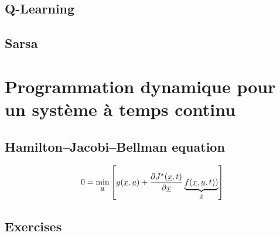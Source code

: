 \subsection{Q-Learning}

\subsection{Sarsa}


\section{Programmation dynamique pour un système à temps continu}
\label{sec:dp_continu}

\subsection{Hamilton–Jacobi–Bellman equation}

\begin{align}
0 =
\operatornamewithlimits{min}\limits_{\col{u}}
\left[
g(\col{x} , \col{u} ) + \frac{\partial	J^*(\col{x},t)}{\partial \col{x} }
\underbrace{
f(\col{x} , \col{u} , t) )
}_{\dot{\col{x}}}
\right]
\label{eq:hjb}
\end{align} 


\subsection{Exercises}